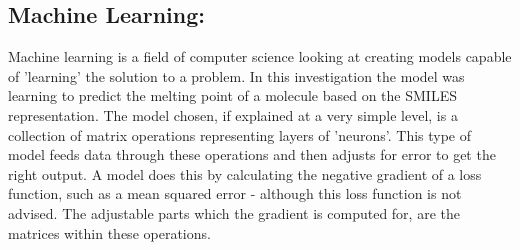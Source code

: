 \documentclass[11pt]{article}
\begin{document}
\subsection{Machine Learning:}
\label{sec:org577f6ca}
Machine learning is a field of computer science looking at creating models capable of 'learning' the solution to a problem. In this investigation the model was learning to predict the melting point of a molecule based on the SMILES representation.
The model chosen, if explained at a very simple level, is a collection of matrix operations representing layers of 'neurons'. This type of model feeds data through these operations and then adjusts for error to get the right output. A model does
this by calculating the negative gradient of a loss function, such as a mean squared error - although this loss function is not advised. The adjustable parts which the gradient is computed for, are the matrices within these operations. 
\end{document}

